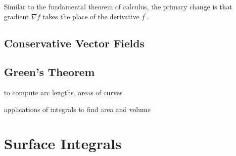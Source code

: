 \begin{remark}
Similar to the fundamental theorem of calculus, the primary change is that gradient $\nabla f$ takes the place of the derivative $f^\prime$.
\end{remark}

\section{Conservative Vector Fields}

\section{Green's Theorem}


to compute arc lengths, areas of curves 

applications of integrals to find area and volume

\chapter{Surface Integrals}